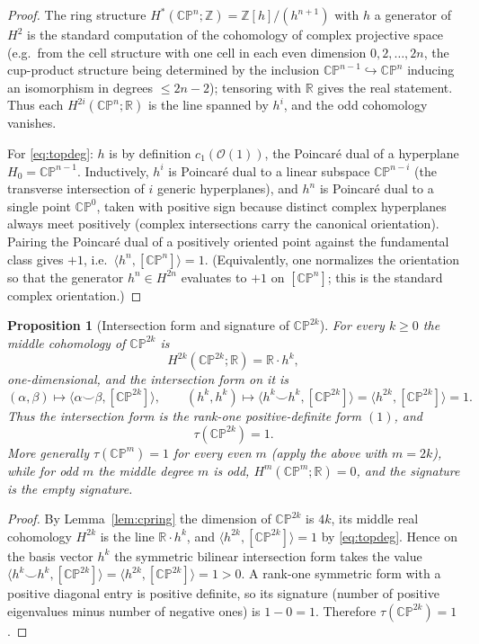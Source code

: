 \documentclass[12pt]{article}
\newtheorem{proposition}{Proposition}
\theoremstyle{definition}
\begin{document}
\begin{proof}
The ring structure $H^*(\mathbb{CP}^n;\mathbb{Z})=\mathbb{Z}[h]/(h^{n+1})$ with
$h$ a generator of $H^2$ is the standard computation of the cohomology of complex
projective space (e.g.\ from the cell structure with one cell in each even dimension
$0,2,\dots,2n$, the cup-product structure being determined by the inclusion
$\mathbb{CP}^{n-1}\hookrightarrow\mathbb{CP}^n$ inducing an isomorphism in degrees
$\le 2n-2$); tensoring with $\mathbb{R}$ gives the real statement.  Thus each
$H^{2i}(\mathbb{CP}^n;\mathbb{R})$ is the line spanned by $h^i$, and the odd cohomology
vanishes.

For \eqref{eq:topdeg}: $h$ is by definition $c_1(\mathcal{O}(1))$, the Poincar\'e dual of
a hyperplane $H_0=\mathbb{CP}^{n-1}$.  Inductively, $h^i$ is Poincar\'e dual to a linear
subspace $\mathbb{CP}^{n-i}$ (the transverse intersection of $i$ generic hyperplanes), and
$h^n$ is Poincar\'e dual to a single point $\mathbb{CP}^0$, taken with positive sign
because distinct complex hyperplanes always meet positively (complex intersections carry
the canonical orientation).  Pairing the Poincar\'e dual of a positively oriented point
against the fundamental class gives $+1$, i.e.\ $\langle h^n,[\mathbb{CP}^n]\rangle=1$.
(Equivalently, one normalizes the orientation so that the generator $h^n\in H^{2n}$
evaluates to $+1$ on $[\mathbb{CP}^n]$; this is the standard complex orientation.)
\end{proof}

\begin{proposition}[Intersection form and signature of $\mathbb{CP}^{2k}$]\label{prop:sig}
For every $k\ge 0$ the middle cohomology of $\mathbb{CP}^{2k}$ is
\[
H^{2k}(\mathbb{CP}^{2k};\mathbb{R})=\mathbb{R}\cdot h^{k},
\]
one-dimensional, and the intersection form on it is
\[
(\alpha,\beta)\longmapsto\langle\alpha\smile\beta,[\mathbb{CP}^{2k}]\rangle,
\qquad
(h^k,h^k)\longmapsto\big\langle h^{k}\smile h^{k},[\mathbb{CP}^{2k}]\big\rangle
=\big\langle h^{2k},[\mathbb{CP}^{2k}]\big\rangle=1.
\]
Thus the intersection form is the rank-one positive-definite form $(1)$, and
\[
\tau(\mathbb{CP}^{2k})=1.
\]
More generally $\tau(\mathbb{CP}^m)=1$ for every even $m$ (apply the above with
$m=2k$), while for odd $m$ the middle degree $m$ is odd, $H^m(\mathbb{CP}^m;\mathbb{R})=0$,
and the signature is the empty signature.
\end{proposition}

\begin{proof}
By Lemma~\ref{lem:cpring} the dimension of $\mathbb{CP}^{2k}$ is $4k$, its middle real
cohomology $H^{2k}$ is the line $\mathbb{R}\cdot h^k$, and
$\langle h^{2k},[\mathbb{CP}^{2k}]\rangle=1$ by \eqref{eq:topdeg}.  Hence on the basis
vector $h^k$ the symmetric bilinear intersection form takes the value
$\langle h^k\smile h^k,[\mathbb{CP}^{2k}]\rangle=\langle h^{2k},[\mathbb{CP}^{2k}]\rangle
=1>0$.  A rank-one symmetric form with a positive diagonal entry is positive definite, so
its signature (number of positive eigenvalues minus number of negative ones) is
$1-0=1$.  Therefore $\tau(\mathbb{CP}^{2k})=1$.
\end{proof}
\end{document}
